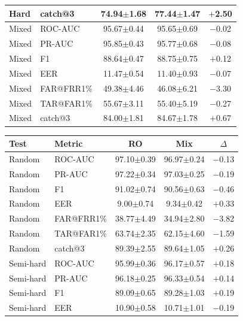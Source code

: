 \documentclass[11pt]{article}
\begin{document}
\begin{table}[!t]
\begin{minipage}[t]{0.48\textwidth}
\begin{tabular}{l l c c c}
Hard      & catch@3    & 74.94$\pm$1.68 & 77.44$\pm$1.47 & $+$2.50 \\
\midrule
Mixed     & ROC-AUC    & 95.67$\pm$0.44 & 95.65$\pm$0.69 & $-$0.02 \\
Mixed     & PR-AUC     & 95.85$\pm$0.43 & 95.77$\pm$0.68 & $-$0.08 \\
Mixed     & F1         & 88.64$\pm$0.47 & 88.75$\pm$0.75 & $+$0.12 \\
Mixed     & EER        & 11.47$\pm$0.54 & 11.40$\pm$0.93 & $-$0.07 \\
Mixed     & FAR@FRR1\% & 49.38$\pm$4.46 & 46.08$\pm$6.21 & $-$3.30 \\
Mixed     & TAR@FAR1\% & 55.67$\pm$3.11 & 55.40$\pm$5.19 & $-$0.27 \\
Mixed     & catch@3    & 84.00$\pm$1.81 & 84.67$\pm$1.78 & $+$0.67 \\
\bottomrule
\end{tabular}
\label{tab:app_pan_distilbert}
\end{minipage}%
\hfill
\begin{minipage}[t]{0.48\textwidth}
\centering
\begin{tabular}{l l c c c}
\toprule
\textbf{Test} & \textbf{Metric} & \textbf{RO} & \textbf{Mix} & \textbf{$\Delta$} \\
\midrule
Random    & ROC-AUC    & 97.10$\pm$0.39 & 96.97$\pm$0.24 & $-$0.13 \\
Random    & PR-AUC     & 97.22$\pm$0.34 & 97.03$\pm$0.25 & $-$0.19 \\
Random    & F1         & 91.02$\pm$0.74 & 90.56$\pm$0.63 & $-$0.46 \\
Random    & EER        & \phantom{0}9.00$\pm$0.74 & \phantom{0}9.34$\pm$0.42 & $+$0.33 \\
Random    & FAR@FRR1\% & 38.77$\pm$4.49 & 34.94$\pm$2.80 & $-$3.82 \\
Random    & TAR@FAR1\% & 63.74$\pm$2.35 & 62.15$\pm$4.60 & $-$1.59 \\
Random    & catch@3    & 89.39$\pm$2.55 & 89.64$\pm$1.05 & $+$0.26 \\
\midrule
Semi-hard & ROC-AUC    & 95.99$\pm$0.36 & 96.17$\pm$0.57 & $+$0.18 \\
Semi-hard & PR-AUC     & 96.18$\pm$0.25 & 96.33$\pm$0.54 & $+$0.14 \\
Semi-hard & F1         & 89.09$\pm$0.65 & 89.28$\pm$1.03 & $+$0.19 \\
Semi-hard & EER        & 10.90$\pm$0.58 & 10.71$\pm$1.01 & $-$0.19 \\

\end{tabular}
\end{minipage}
\end{table}
\end{document}
